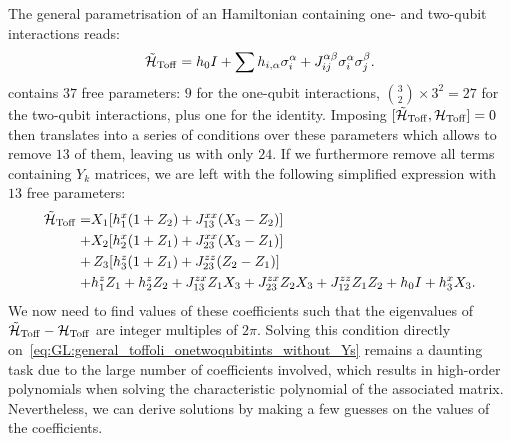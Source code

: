 The general parametrisation of an Hamiltonian containing one- and two-qubit interactions reads:
\begin{equation}
    \tilde{{\mathcal{H}}}_{\operatorname{Toff}} =
    h_0 I + \sum h_{i,\alpha}\sigma_i^\alpha
    + J_{ij}^{\alpha\beta}\sigma_i^\alpha\sigma_j^\beta.
    \label{eq:GL:general_toffoli_onetwoqubitints}
\end{equation}
 contains $37$ free parameters: $9$ for the one-qubit interactions, $\binom{3}{2}\times 3^2=27$ for the two-qubit interactions, plus one for the identity.
Imposing $[\tilde{{\mathcal{H}}}_{\operatorname{Toff}},{\mathcal{H}}_{\operatorname{Toff}}]=0$ then translates into a series of conditions over these parameters which allows to remove $13$ of them, leaving us with only $24$.
If we furthermore remove all terms containing $Y_k$ matrices, we are left with the following simplified expression with $13$ free parameters:
\begin{equation}
\begin{aligned}
    \tilde{{\mathcal{H}}}_{\operatorname{Toff}} =
    & X_1 [h_1^x (1 + Z_2) + J_{13}^{xx} (X_3 - Z_2)] \\
    +&X_2 [h_2^x (1 + Z_1) + J_{23}^{xx} (X_3 - Z_1)] \\
    +&\,Z_3 [h_3^z(1 + Z_1) + J_{23}^{zz} (Z_2 - Z_1)] \\
    + &h_1^z Z_1 + h_2^z Z_2
    + J_{13}^{zx} Z_1 X_3 + J_{23}^{zx} Z_2 X_3 + J_{12}^{zz} Z_1 Z_2
    +h_0 I + h_3^x X_3.
    \label{eq:GL:general_toffoli_onetwoqubitints_without_Ys}
\end{aligned}
\end{equation}
We now need to find values of these coefficients such that the eigenvalues of $\tilde{{\mathcal{H}}}_{\operatorname{Toff}}-{\mathcal{H}}_{\operatorname{Toff}}$ are integer multiples of $2\pi$.
Solving this condition directly on~\cref{eq:GL:general_toffoli_onetwoqubitints_without_Ys} remains a daunting task due to the large number of coefficients involved, which results in high-order polynomials when solving the characteristic polynomial of the associated matrix.
Nevertheless, we can derive solutions by making a few guesses on the values of the coefficients.

